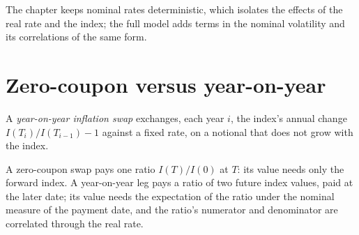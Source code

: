 The chapter keeps nominal rates deterministic, which isolates the effects of the
real rate and the index; the full model adds terms in the nominal volatility and
its correlations of the same form.

\begin{omfigure}

\label{fig:rc:inflation-derivatives:analogy}
\end{omfigure}

\section{Zero-coupon versus year-on-year}

\begin{definition}\label{def:rc:inflation-derivatives:yoy}
A \emph{year-on-year inflation swap} exchanges,
each year $i$, the index's annual change $I(T_i)/I(T_{i-1})-1$ against a fixed
rate, on a notional that does not grow with the index.
\end{definition}

A zero-coupon swap pays one ratio $I(T)/I(0)$ at $T$: its value needs only the forward
index. A year-on-year leg pays a ratio of two future index values, paid at the later
date; its value needs the expectation of the ratio under the nominal measure of the
payment date, and the ratio's numerator and denominator are correlated through the
real rate.

